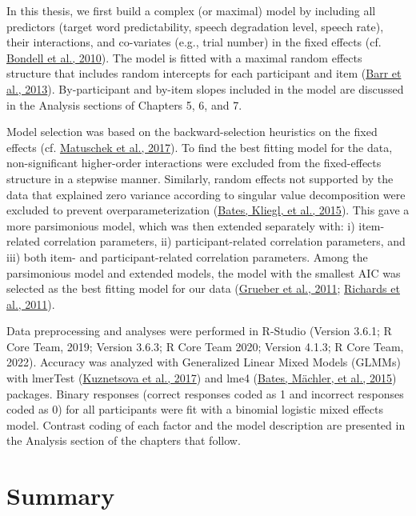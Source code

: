 \documentclass[a4paper, nobind]{templates/ociamthesis}
\begin{document}
In this thesis,
we first build a complex (or maximal) model by including all predictors (target word predictability, speech degradation level, speech rate),
their interactions, and co-variates (e.g., trial number) in the fixed effects (cf. \protect\hyperlink{ref-Bondell2010}{Bondell et al., 2010}).
The model is fitted with a maximal random effects structure that includes random intercepts for each participant and item (\protect\hyperlink{ref-Barr2013}{Barr et al., 2013}).
By-participant and by-item slopes included in the model are discussed in the Analysis sections of Chapters 5, 6, and 7.

Model selection was based on the backward-selection heuristics on the fixed effects (cf. \protect\hyperlink{ref-Matuschek2017}{Matuschek et al., 2017}).
To find the best fitting model for the data,
non-significant higher-order interactions were excluded from the fixed-effects structure in a stepwise manner.
Similarly, random effects not supported by the data that explained zero variance according to singular value decomposition were excluded to prevent overparameterization (\protect\hyperlink{ref-Bates2015a}{Bates, Kliegl, et al., 2015}).
This gave a more parsimonious model, which was then extended separately with: i) item-related correlation parameters, ii) participant-related correlation parameters, and iii) both item- and participant-related correlation parameters.
Among the parsimonious model and extended models,
the model with the smallest AIC was selected as the best fitting model for our data (\protect\hyperlink{ref-Grueber2011}{Grueber et al., 2011}; \protect\hyperlink{ref-Richards2011}{Richards et al., 2011}).

Data preprocessing and analyses were performed in R-Studio (Version 3.6.1; R Core Team, 2019; Version 3.6.3; R Core Team 2020; Version 4.1.3; R Core Team, 2022).
Accuracy was analyzed with Generalized Linear Mixed Models (GLMMs) with lmerTest (\protect\hyperlink{ref-Kuznetsova2017}{Kuznetsova et al., 2017}) and lme4 (\protect\hyperlink{ref-Bates2015}{Bates, Mächler, et al., 2015}) packages.
Binary responses (correct responses coded as 1 and incorrect responses coded as 0) for all participants were fit with a binomial logistic mixed effects model.
Contrast coding of each factor and the model description are presented in the Analysis section of the chapters that follow.

\hypertarget{summary-1}{%
\section{Summary}\label{summary-1}}
\end{document}
